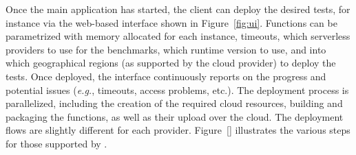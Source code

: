 Once the main application has started, the client can deploy the desired tests, for instance via the web-based interface shown in Figure~\ref{fig:ui}.
Functions can be parametrized with memory allocated for each instance, timeouts, which serverless providers to use for the benchmarks, which runtime version to use, and into which geographical regions (as supported by the cloud provider) to deploy the tests. 
Once deployed, the interface continuously reports on the progress and potential issues (\emph{e.g.}, timeouts, access problems, etc.). 
The deployment process is parallelized, including the creation of the required cloud resources, building and packaging the functions, as well as their upload over the cloud.
The deployment flows are slightly different for each provider. 
Figure~\ref{} illustrates the various steps for those supported by \sys.
 

